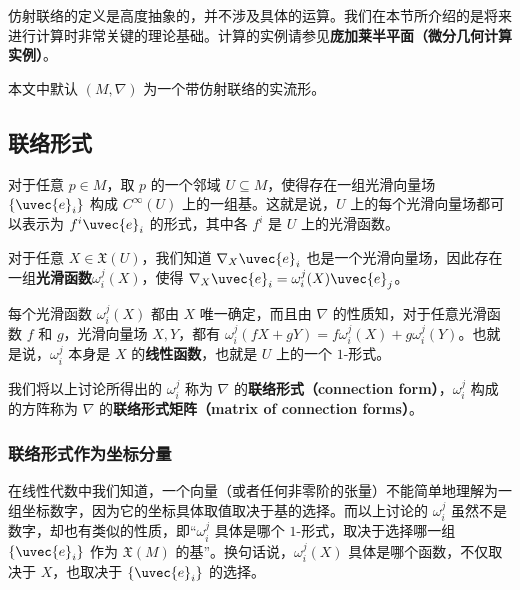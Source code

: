 



仿射联络的定义是高度抽象的，并不涉及具体的运算。我们在本节所介绍的是将来进行计算时非常关键的理论基础。计算的实例请参见\textbf{庞加莱半平面（微分几何计算实例）}。

本文中默认 $(M, \nabla)$ 为一个带仿射联络的实流形。

\subsection{联络形式}

对于任意 $p\in M$，取 $p$ 的一个邻域 $U\subseteq M$，使得存在一组光滑向量场 $\{\uvec{e}_i\}$ 构成 $C^{\infty}(U)$ 上的一组基。这就是说，$U$ 上的每个光滑向量场都可以表示为 $f^i\uvec{e}_i$ 的形式，其中各 $f^i$ 是 $U$ 上的光滑函数。

对于任意 $X\in\mathfrak{X}(U)$，我们知道 $\nabla_X\uvec{e}_i$ 也是一个光滑向量场，因此存在一组\textbf{光滑函数}$\omega^j_i(X)$，使得 $\nabla_X\uvec{e}_i=\omega^j_i(X)\uvec{e}_j$。

每个光滑函数 $\omega^j_i(X)$ 都由 $X$ 唯一确定，而且由 $\nabla$ 的性质知，对于任意光滑函数 $f$ 和 $g$，光滑向量场 $X, Y$，都有 $\omega^j_i(fX+gY)=f\omega^j_i(X)+g\omega^j_i(Y)$。也就是说，$\omega^j_i$ 本身是 $X$ 的\textbf{线性函数}，也就是 $U$ 上的一个 $1$-形式。

我们将以上讨论所得出的 $\omega^j_i$ 称为 $\nabla$ 的\textbf{联络形式（connection form）}，$\omega^j_i$ 构成的方阵称为 $\nabla$ 的\textbf{联络形式矩阵（matrix of connection forms）}。

\subsubsection{联络形式作为坐标分量}

在线性代数中我们知道，一个向量（或者任何非零阶的张量）不能简单地理解为一组坐标数字，因为它的坐标具体取值取决于基的选择。而以上讨论的 $\omega^j_i$ 虽然不是数字，却也有类似的性质，即“$\omega^j_i$ 具体是哪个 $1$-形式，取决于选择哪一组 $\{\uvec{e}_i\}$ 作为 $\mathfrak{X}(M)$ 的基”。换句话说，$\omega^j_i(X)$ 具体是哪个函数，不仅取决于 $X$，也取决于 $\{\uvec{e}_i\}$ 的选择。


